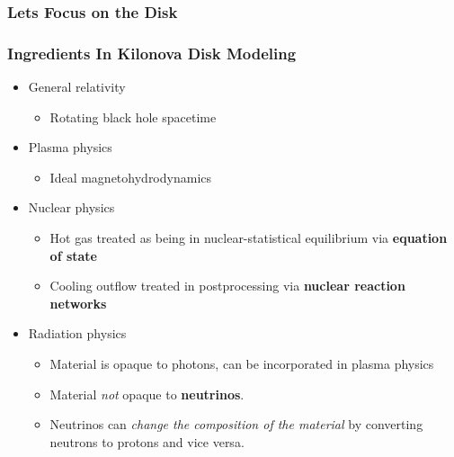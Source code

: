 \documentclass[]{beamer}
\begin{document}
\begin{frame}
  \frametitle{Lets Focus on the Disk}
  \begin{center}
  \end{center}
\end{frame}

\begin{frame}
  \frametitle{Ingredients In Kilonova Disk Modeling}
  \begin{itemize}
  \item General relativity
    \begin{itemize}
    \item Rotating black hole spacetime
    \end{itemize}
  \item Plasma physics
    \begin{itemize}
    \item Ideal magnetohydrodynamics
    \end{itemize}
  \item Nuclear physics
    \begin{itemize}
    \item Hot gas treated as being in nuclear-statistical equilibrium via \textbf{equation of state}
    \item Cooling outflow treated in postprocessing via \textbf{nuclear reaction networks}
    \end{itemize}
  \item Radiation physics
    \begin{itemize}
    \item Material is opaque to photons, can be incorporated in plasma physics
    \item Material \textit{not} opaque to \textbf{neutrinos}.
    \item Neutrinos can \textit{change the composition of the
        material} by converting neutrons to protons and vice versa.
    \end{itemize}
  \end{itemize}
\end{frame}
\end{document}
